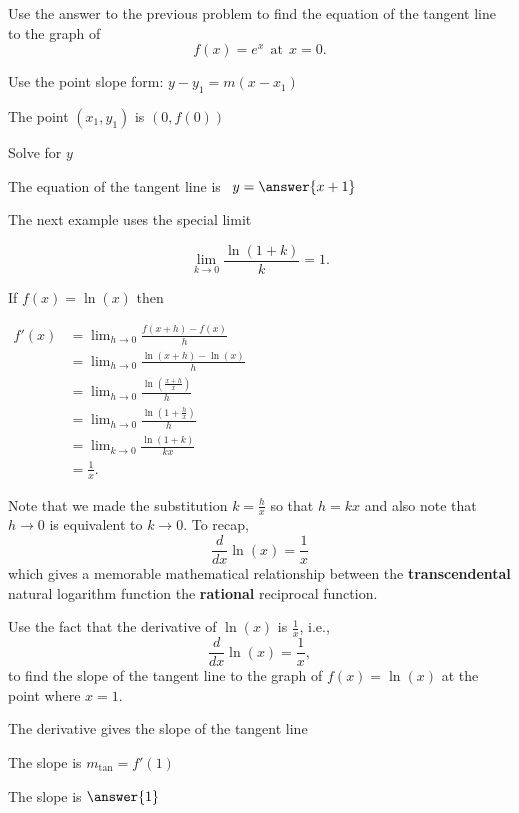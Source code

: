 \documentclass{ximera}
\begin{document}
\begin{problem} %
Use the answer to the previous problem to find the equation of the tangent line to the graph of 
\[
f(x) = e^x \ \ \text{at} \ \ x=0.
\]
\begin{hint}
Use the point slope form: $y-y_1 = m(x-x_1)$
\end{hint}
\begin{hint}
The point $(x_1,y_1)$ is $(0, f(0))$
\end{hint}
\begin{hint}
Solve for $y$
\end{hint}
The equation of the tangent line is \ $y = \answer{x+1}$
\end{problem}



The next example uses the special limit 

\[\lim_{k \to 0} \frac{\ln(1 + k)}{k} = 1.\]



\begin{example} %
If $f(x) = \ln(x)$ then\\[10pt]
\begin{center}
$\begin{aligned}
f'(x) &= \lim_{h \to 0} \frac{f(x+h)-f(x)}{h}\\[5pt]
&= \lim_{h \to 0}\frac{\ln(x+h)-\ln(x)}{h}\\[5pt]
&= \lim_{h \to 0} \frac{\ln(\frac{x+h}{x})}{h}\\[5pt]
&= \lim_{h \to 0}\frac{\ln(1 + \frac{h}{x})}{h}\\[5pt]
&= \lim_{k \to 0} \frac{\ln(1 + k)}{kx} \\[5pt]
&= \frac{1}{x}.
\end{aligned}$
\end{center}

Note that we made the substitution $k =\frac{h}{x}$ so that $h = kx$ and  also note 
that $h\to 0$ is equivalent to $k\to 0$.
To recap, 
\[
\frac{d}{dx} \ln(x) = \frac{1}{x}
\]
which gives a memorable mathematical relationship between the \textbf{transcendental} natural logarithm function 
the \textbf{rational} reciprocal function.

\end{example}


\begin{problem} %
Use the fact that the derivative of $\ln(x)$ is $\frac{1}{x}$,
i.e., 
\[
\frac{d}{dx}\ln(x) = \frac{1}{x},
\]
to find the slope of the tangent line to the graph of 
$f(x) = \ln(x)$ at the point where $x = 1$.\\
\begin{hint}
The derivative gives the slope of the tangent line
\end{hint}
\begin{hint}
The slope is $m_{\text{tan}} = f'(1)$
\end{hint}
The slope is $\answer{1}$
\end{problem}
\end{document}
